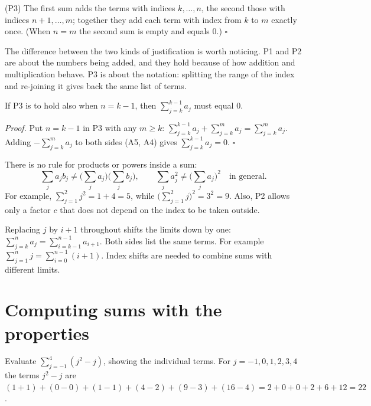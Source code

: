 (P3) The first sum adds the terms with indices $k,\dots,n$, the second those with indices $n+1,\dots,m$; together
they add each term with index from $k$ to $m$ exactly once. (When $n=m$ the second sum is empty and equals $0$.)
\hfill$\square$

The difference between the two kinds of justification is worth noticing. P1 and P2 are about the numbers being
added, and they hold because of how addition and multiplication behave. P3 is about the notation: splitting the
range of the index and re-joining it gives back the same list of terms.

\begin{proposition}
If P3 is to hold also when $n=k-1$, then $\sum_{j=k}^{k-1}a_j$ must equal $0$.
\end{proposition}
\emph{Proof.} Put $n=k-1$ in P3 with any $m\ge k$: $\sum_{j=k}^{k-1}a_j+\sum_{j=k}^{m}a_j=\sum_{j=k}^{m}a_j$.
Adding $-\sum_{j=k}^m a_j$ to both sides (A5, A4) gives $\sum_{j=k}^{k-1}a_j=0$. \hfill$\square$

\begin{warning}
There is no rule for products or powers inside a sum:
\[
\sum_{j}a_jb_j\ne\Big(\sum_j a_j\Big)\Big(\sum_j b_j\Big),\qquad \sum_j a_j^2\ne\Big(\sum_j a_j\Big)^2\quad\text{in general.}
\]
For example, $\sum_{j=1}^2 j^2=1+4=5$, while $\big(\sum_{j=1}^2 j\big)^2=3^2=9$. Also, P2 allows only a factor $c$ that
does not depend on the index to be taken outside.
\end{warning}

\begin{external}
Replacing $j$ by $i+1$ throughout shifts the limits down by one:
$\sum_{j=k}^{n}a_j=\sum_{i=k-1}^{n-1}a_{i+1}$. Both sides list the same terms. For example
$\sum_{j=1}^{n}j=\sum_{i=0}^{n-1}(i+1)$. Index shifts are needed to combine sums with different limits.
\end{external}

\section{Computing sums with the properties}\label{sec:sigma-compute}

\begin{example}
Evaluate $\sum_{j=-1}^{4}(j^2-j)$, showing the individual terms. 
\solution
For $j=-1,0,1,2,3,4$ the terms $j^2-j$ are
$(1+1)+(0-0)+(1-1)+(4-2)+(9-3)+(16-4)=2+0+0+2+6+12=22$.
\end{example}

